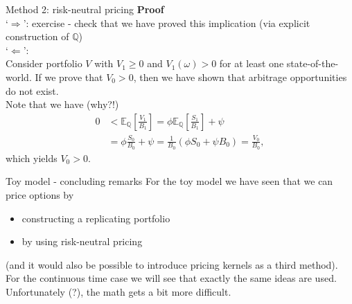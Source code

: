 \documentclass[pdf, handout]{beamer}
\begin{document}
\begin{frame}{Method 2: risk-neutral pricing}
\textbf{Proof} \\
`$\Rightarrow$':  exercise - check that we have proved this implication
(via explicit construction of $\mathbb{Q}$) \\
`$\Leftarrow$': \\
Consider portfolio $V$  with $V_1\geq 0$ and $V_1(\omega) >0$ for at least one state-of-the-world. If we prove that $V_0 > 0$, then we have shown that arbitrage opportunities do not exist. \\
Note that we have (why?!)
\begin{align*}
0 &< \mathbb{E}_{\mathbb{Q}}\left[ \frac{V_1}{B_1} \right]
=
\phi\mathbb{E}_{\mathbb{Q}}\left[ \frac{S_1}{B_1} \right] + \psi
\\ 
&= \phi \frac{S_0}{B_0} + \psi = \frac{1}{B_0}(\phi S_0 + \psi B_0)
= \frac{V_0}{B_0},
\end{align*}
which yields $V_0>0$.
\end{frame}

\begin{frame}{Toy model - concluding remarks}
For the toy model we have seen that we can price options 
by
\begin{itemize}
\item constructing a replicating portfolio
\item by using risk-neutral pricing
\end{itemize}
(and it would also be possible to introduce pricing kernels as a third method).
\\
\vspace{.5cm}
For the continuous time case we will see that exactly the same ideas are used. Unfortunately (?), the math gets a bit more difficult.
\end{frame}
\end{document}
